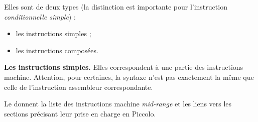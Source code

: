 Elles sont de deux types (la distinction est importante pour l’instruction \emph{conditionnelle simple}) :
\begin{itemize}
  \item les instructions simples ;
  \item les instructions composées.

\end{itemize}


\textbf{Les instructions simples.} Elles correspondent à une partie des instructions machine. Attention, pour certaines, la syntaxe n'est pas exactement la même que celle de l'instruction assembleur correspondante.

Le  donnent la liste des instructions machine \emph{mid-range} et les liens vers les sections précisant leur prise en charge en Piccolo.

